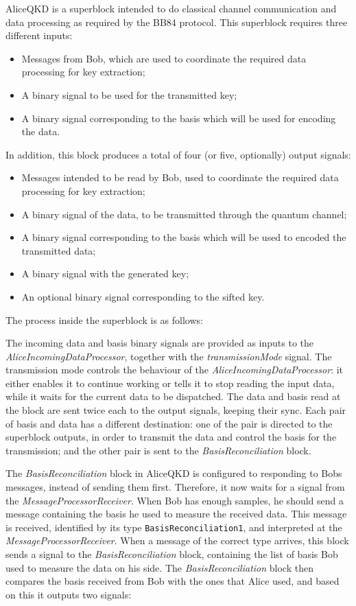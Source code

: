 AliceQKD is a superblock intended to do classical channel communication and 
data processing  as required by the BB84 protocol. This superblock requires 
three different inputs:

\begin{itemize}
	\item Messages from Bob, which are used to coordinate the required data 
	processing for key extraction;
	\item A binary signal to be used for the transmitted key;
	\item A binary signal corresponding to the basis which will be used for 
	encoding the data.
\end{itemize}

In addition, this block produces a total of four (or five, optionally) output signals:

\begin{itemize}
	\item	Messages intended to be read by Bob, used to coordinate the required 
	data processing for key extraction;
	\item A binary signal of the data, to be transmitted through the quantum 
	channel;
	\item A binary signal corresponding to the basis which will be used to 
	encoded the transmitted data;
	\item A binary signal with the generated key;
	\item An optional binary signal corresponding to the sifted key.
\end{itemize}


The process inside the superblock is as follows:

The incoming data and basis binary signals are provided as inputs to the 
\textit{AliceIncomingDataProcessor}, together with the 
\textit{transmissionMode} signal. 
The transmission mode controls the behaviour of the 
\textit{AliceIncomingDataProcessor}: it either enables it to continue working 
or tells it to stop reading the input data, while it waits for the current data
to be dispatched.
The data and basis read at the block are sent twice each to the output signals, 
keeping their sync. Each pair of basis and data has a different destination: 
one of the pair is directed to the superblock outputs, in order to transmit the 
data and control the basis for the transmission; and the other pair is sent to 
the \textit{BasisReconciliation} block.

The \textit{BasisReconciliation} block in AliceQKD is configured to responding
to Bobs messages, instead of sending them first. Therefore, it now waits for a 
signal from the 
\textit{MessageProcessorReceiver}. When Bob has enough samples, he should send 
a message containing the basis he used to measure the received data. This 
message is received, identified by its type \texttt{BasisReconciliation1}, and 
interpreted at the \textit{MessageProcessorReceiver}. 
When a message of the correct type arrives, this block sends a signal to the 
\textit{BasisReconciliation} block, containing the list of basis Bob used to 
measure the data on his side. The \textit{BasisReconciliation} block then 
compares the basis received from Bob with the ones that Alice used, and based 
on this it outputs two signals:

